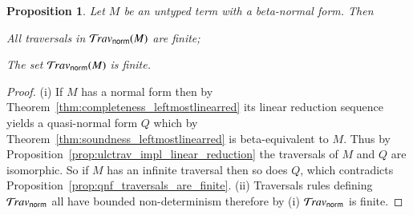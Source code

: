 \documentclass{elsarticle}
\theoremstyle{plain}
\newtheorem{proposition}[theorem]{Proposition}
\theoremstyle{definition}
\theoremstyle{remark}
\newcommand{\normalizing}{{\sf norm}}
\newcommand{\travsetnorm}{\travset_\normalizing}
\begin{document}
\begin{proposition}
\label{prop:ulc_travnorm_finite}
Let $M$ be an untyped term with a beta-normal form. Then
\begin{enumerate*}[label=(\roman*)]
\item All traversals in $\travsetnorm(M)$ are finite;
\item The set $\travsetnorm(M)$ is finite.
\end{enumerate*}
\end{proposition}
\begin{proof}
(i) If $M$ has a normal form then by Theorem~\ref{thm:completeness_leftmostlinearred} its linear reduction sequence yields a quasi-normal form $Q$ which by Theorem~\ref{thm:soundness_leftmostlinearred} is beta-equivalent to $M$. Thus by Proposition~\ref{prop:ulctrav_impl_linear_reduction} the traversals of $M$ and $Q$ are isomorphic. So if $M$ has an infinite traversal then so does $Q$, which contradicts Proposition~\ref{prop:qnf_traversals_are_finite}.
(ii) Traversals rules defining $\travsetnorm$ all have bounded non-determinism therefore by (i) $\travsetnorm$ is finite.
\end{proof}

\end{document}
